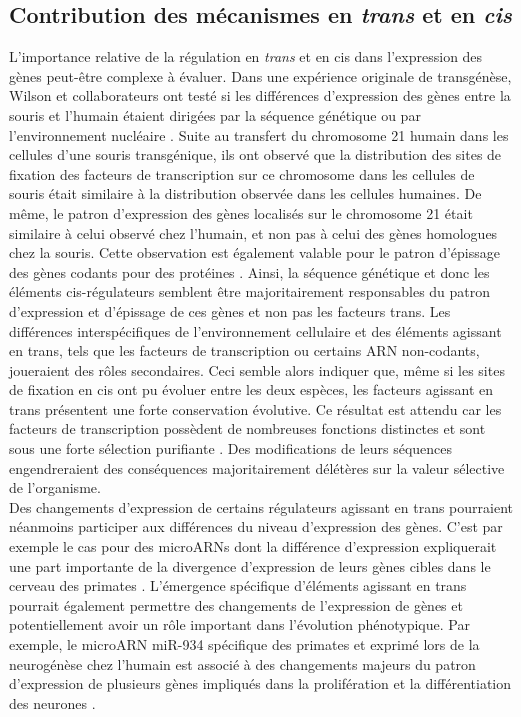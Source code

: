 \subsection{Contribution des mécanismes en \textit{trans} et en \textit{cis}}
\label{subsec:contrib-cis-trans}

L’importance relative de la régulation en \textit{trans} et en \gls{cis} dans l’expression des gènes peut-être complexe à évaluer. Dans une expérience originale de transgénèse, Wilson et collaborateurs ont testé si les différences d’expression des gènes entre la souris et l’humain étaient dirigées par la séquence génétique ou par l’environnement nucléaire \citep{wilson_species-specific_2008}. Suite au transfert du chromosome 21 humain dans les cellules d’une souris transgénique, ils ont observé que la distribution des sites de fixation des facteurs de transcription sur ce chromosome dans les cellules de souris était similaire à la distribution observée dans les cellules humaines. De même, le patron d’expression des gènes localisés sur le chromosome 21 était similaire à celui observé chez l’humain, et non pas à celui des gènes homologues chez la souris. Cette observation est également valable pour le patron d’épissage des gènes codants pour des protéines \citep{barbosa-morais_evolutionary_2012}. Ainsi, la séquence génétique et donc les éléments \gls{cis}-régulateurs semblent être majoritairement responsables du patron d’expression et d’épissage de ces gènes et non pas les facteurs \gls{trans}. Les différences interspécifiques de l’environnement cellulaire et des éléments agissant en \gls{trans}, tels que les facteurs de transcription ou certains \acrshort{ARN} non-codants, joueraient des rôles secondaires. Ceci semble alors indiquer que, même si les sites de fixation en \gls{cis} ont pu évoluer entre les deux espèces, les facteurs agissant en \gls{trans} présentent une forte conservation évolutive. Ce résultat est attendu car les facteurs de transcription possèdent de nombreuses fonctions distinctes et sont sous une forte sélection purifiante \citep{wray_evolutionary_2007}. Des modifications de leurs séquences engendreraient des conséquences majoritairement délétères sur la valeur sélective de l’organisme. \\

Des changements d’expression de certains régulateurs agissant en \gls{trans} pourraient néanmoins participer aux différences du niveau d’expression des gènes. C’est par exemple le cas pour des microARNs dont la différence d’expression expliquerait une part importante de la divergence d’expression de leurs gènes cibles dans le cerveau des primates \citep{hu_microrna_2011}. L’émergence spécifique d’éléments agissant en \gls{trans} pourrait également permettre des changements de l’expression de gènes et potentiellement avoir un rôle important dans l'évolution phénotypique. Par exemple, le microARN miR-934 spécifique des primates et exprimé lors de la neurogénèse chez l’humain est associé à des changements majeurs du patron d’expression de plusieurs gènes impliqués dans la prolifération et la différentiation des neurones \citep{prodromidou_microrna-934_2020}.

